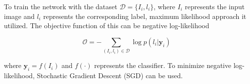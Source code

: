 To train the network with the dataset $\mathcal{D} = \{I_i, l_i\}$, where $I_i$ represents
the input image and $l_i$ represents the corresponding label, maximum likelihood approach
it utilized. The objective function of this can be negative log-likelihood

\begin{equation}
    \mathcal{O} = -\sum_{(I_i, l_i)\in\mathcal{D}} \log p(l_i|\mathbf{y}_i)
\end{equation}

where $\mathbf{y}_i = f(I_i)$ and $f(\cdot)$ represents the classifier. To minimize negative
log-likelihood, Stochastic Gradient Descent (SGD) can be used.
